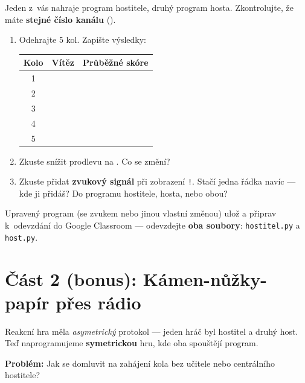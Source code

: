 \begin{ukol}

Jeden z~vás nahraje program hostitele, druhý program hosta.
Zkontrolujte, že máte \textbf{stejné číslo kanálu} ().

\begin{enumerate}
  \item Odehrajte 5 kol. Zapište výsledky:

  \medskip
  \begin{tabular}{ccc}
    \toprule
    \textbf{Kolo} & \textbf{Vítěz} & \textbf{Průběžné skóre} \\
    \midrule
    1 & & \\[4pt]
    2 & & \\[4pt]
    3 & & \\[4pt]
    4 & & \\[4pt]
    5 & & \\
    \bottomrule
  \end{tabular}

  \medskip
  \item Zkuste snížit prodlevu na .
        Co se změní?
  \odpoved[1cm]

  \item Zkuste přidat \textbf{zvukový signál} při zobrazení \texttt{!}.
        Stačí jedna řádka navíc — kde ji přidáš? Do programu hostitele, hosta, nebo obou?
  \odpoved[1cm]
\end{enumerate}

\medskip\noindent
Upravený program (se zvukem nebo jinou vlastní změnou) ulož a připrav k~odevzdání
do Google Classroom — odevzdejte \textbf{oba soubory}: \texttt{hostitel.py} a \texttt{host.py}.

\end{ukol}

\section*{Část 2 (bonus): Kámen-nůžky-papír přes rádio}

\noindent
Reakcní hra měla \emph{asymetrický} protokol — jeden hráč byl hostitel a druhý host.
Teď naprogramujeme \textbf{symetrickou} hru, kde oba spouštějí  program.

\medskip\noindent
\textbf{Problém:} Jak se domluvit na zahájení kola bez učitele nebo centrálního hostitele?

